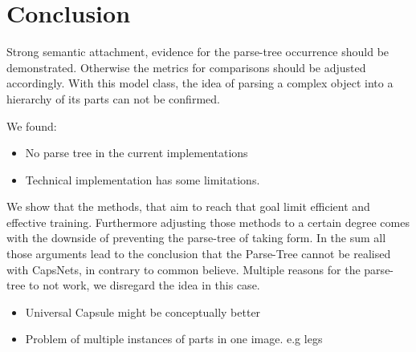 \documentclass{article}
\begin{document}
\section{Conclusion}

Strong semantic attachment, evidence for the parse-tree occurrence should be demonstrated. Otherwise the metrics for comparisons should be adjusted accordingly.
With this model class, the idea of parsing a complex object into a hierarchy of its parts can not be confirmed.

We found:
\begin{itemize}
	\item No parse tree in the current implementations
	\item Technical implementation has some limitations.
\end{itemize}

We show that the methods, that aim to reach that goal limit efficient and effective training.
Furthermore adjusting those methods to a certain degree comes with the downside of preventing the parse-tree of taking form.
In the sum all those arguments lead to the conclusion that the Parse-Tree cannot be realised with CapsNets, in contrary to common believe.
Multiple reasons for the parse-tree to not work, we disregard the idea in this case.

\begin{itemize}
	\item Universal Capsule might be conceptually better
	\item Problem of multiple instances of parts in one image. e.g legs
\end{itemize}



%


\end{document}
